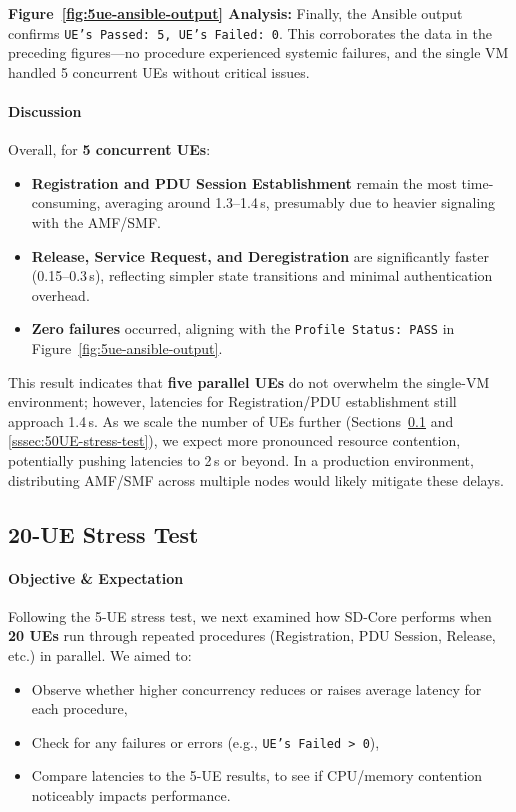 \noindent
\textbf{Figure~\ref{fig:5ue-ansible-output} Analysis:}  
Finally, the Ansible output confirms \texttt{UE's Passed: 5, UE's Failed: 0}. This corroborates the data in the preceding figures—no procedure experienced systemic failures, and the single VM handled 5 concurrent UEs without critical issues.

\paragraph{Discussion}
Overall, for \textbf{5 concurrent UEs}:
\begin{itemize}
  \item \textbf{Registration and PDU Session Establishment} remain the most time-consuming, averaging around 1.3--1.4\,s, presumably due to heavier signaling with the AMF/SMF.
  \item \textbf{Release, Service Request, and Deregistration} are significantly faster (0.15--0.3\,s), reflecting simpler state transitions and minimal authentication overhead.
  \item \textbf{Zero failures} occurred, aligning with the \texttt{Profile Status: PASS} in Figure~\ref{fig:5ue-ansible-output}.
\end{itemize}

This result indicates that \textbf{five parallel UEs} do not overwhelm the single-VM environment; however, latencies for Registration/PDU establishment still approach 1.4\,s. As we scale the number of UEs further (Sections~\ref{sssec:20UE-stress-test} and \ref{sssec:50UE-stress-test}), we expect more pronounced resource contention, potentially pushing latencies to 2\,s or beyond. In a production environment, distributing AMF/SMF across multiple nodes would likely mitigate these delays.

\subsection{20-UE Stress Test}
\label{sssec:20UE-stress-test}

\paragraph{Objective \& Expectation}
Following the 5-UE stress test, we next examined how SD-Core performs when \textbf{20 UEs} run through repeated procedures (Registration, PDU Session, Release, etc.) in parallel. We aimed to:
\begin{itemize}
    \item Observe whether higher concurrency reduces or raises average latency for each procedure,
    \item Check for any failures or errors (e.g., \texttt{UE's Failed > 0}),
    \item Compare latencies to the 5-UE results, to see if CPU/memory contention noticeably impacts performance.
\end{itemize}

